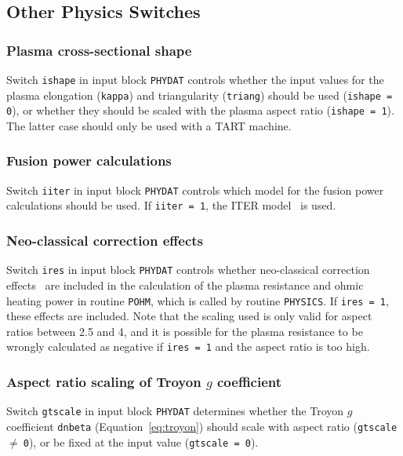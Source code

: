 \documentclass[11pt,a4paper]{report}
\begin{document}
\subsection{Other Physics Switches}

\subsubsection{Plasma cross-sectional shape}

Switch \texttt{ishape} in input block \texttt{PHYDAT} controls whether the
input values for the plasma elongation (\texttt{kappa}) and triangularity
(\texttt{triang}) should be used (\texttt{ishape = 0}), or whether they should
be scaled with the plasma aspect ratio (\texttt{ishape = 1}). The latter case
should only be used with a TART machine.

\subsubsection{Fusion power calculations}

Switch {\tt iiter} in input block {\tt PHYDAT} controls which model for the
fusion power calculations should be used. If {\tt iiter = 1}, the ITER
model~\cite{IPDG} is used.

\subsubsection{Neo-classical correction effects}

Switch {\tt ires} in input block {\tt PHYDAT} controls whether neo-classical
correction effects~\cite{Uckan} are included in the calculation of the plasma
resistance and ohmic heating power in routine {\tt POHM}, which is called by
routine {\tt PHYSICS}. If {\tt ires = 1}, these effects are included. Note
that the scaling used is only valid for aspect ratios between 2.5 and 4, and
it is possible for the plasma resistance to be wrongly calculated as negative
if {\tt ires = 1} and the aspect ratio is too high.

\subsubsection{Aspect ratio scaling of Troyon $g$ coefficient}

Switch {\tt gtscale} in input block {\tt PHYDAT} determines whether the Troyon
$g$ coefficient {\tt dnbeta} (Equation~\ref{eq:troyon}) should scale with
aspect ratio ({\tt gtscale }$\not=~${\tt 0}), or be fixed at the input value
({\tt gtscale = 0}).
\end{document}
